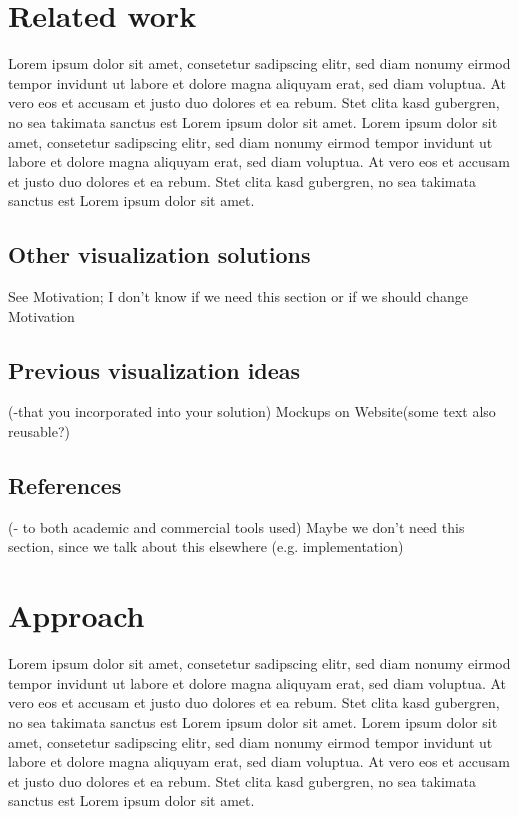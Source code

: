 \documentclass{vgtc}                          %
\begin{document}
\section{Related work}

Lorem ipsum dolor sit amet, consetetur sadipscing elitr, sed diam
nonumy eirmod tempor invidunt ut labore et dolore magna aliquyam erat,
sed diam voluptua. At vero eos et accusam et justo duo dolores et ea
rebum. Stet clita kasd gubergren, no sea takimata sanctus est Lorem
ipsum dolor sit amet. Lorem ipsum dolor sit amet, consetetur
sadipscing elitr, sed diam nonumy eirmod tempor invidunt ut labore et
dolore magna aliquyam erat, sed diam voluptua. At vero eos et accusam
et justo duo dolores et ea rebum. Stet clita kasd gubergren, no sea
takimata sanctus est Lorem ipsum dolor sit amet.

\subsection{Other visualization solutions}
See Motivation; I don't know if we need this section or if we should change Motivation
\subsection{Previous visualization ideas}
(-that you incorporated into your solution)
Mockups on Website(some text also reusable?)
\subsection{References}
(- to both academic and commercial tools used)
Maybe we don't need this section, since we talk about this elsewhere (e.g. implementation)

\section{Approach}

Lorem ipsum dolor sit amet, consetetur sadipscing elitr, sed diam
nonumy eirmod tempor invidunt ut labore et dolore magna aliquyam erat,
sed diam voluptua. At vero eos et accusam et justo duo dolores et ea
rebum. Stet clita kasd gubergren, no sea takimata sanctus est Lorem
ipsum dolor sit amet. Lorem ipsum dolor sit amet, consetetur
sadipscing elitr, sed diam nonumy eirmod tempor invidunt ut labore et
dolore magna aliquyam erat, sed diam voluptua. At vero eos et accusam
et justo duo dolores et ea rebum. Stet clita kasd gubergren, no sea
takimata sanctus est Lorem ipsum dolor sit amet.
\end{document}
